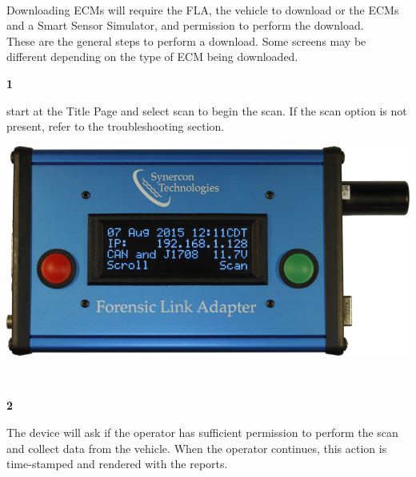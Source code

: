 \documentclass[11pt, oneside]{book}
\begin{document}
\paragraph{  }
Downloading ECMs will require the FLA, the vehicle to download or the ECMs and a Smart Sensor Simulator, and permission to perform the download.
\\
These are the general steps to perform a download. Some screens may be different depending on the type of ECM being downloaded.
\\[\baselineskip]
\noindent\begin{minipage}{0.45\textwidth}%
\begin{center}
\textbf{1}\\[\baselineskip]
\end{center}
start at the Title Page and select scan to begin the scan. If the scan option is not present, refer to the troubleshooting section.
\end{minipage}%
\hfill%
\begin{minipage}{0.45\textwidth}
\includegraphics[width=\linewidth]{../media/fla_screens/ethernet_and_others/main/title_both}
\end{minipage}
\\[\baselineskip]\noindent\begin{minipage}{0.45\textwidth}%
\begin{center}
\textbf{2}\\[\baselineskip]
\end{center}
The device will ask if the operator has sufficient permission to perform the scan and collect data from the vehicle. When the operator continues, this action is time-stamped and rendered with the reports.
\end{minipage}%
\hfill%
\end{document}

